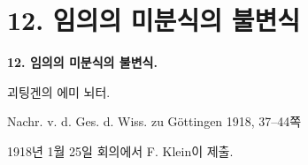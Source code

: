 
\section*{12. 임의의 미분식의 불변식}
\begin{center}
{\Large\bfseries 12. 임의의 미분식의 불변식.}\par
\vspace{0.8em}
괴팅겐의 에미 뇌터.\par
\vspace{1.5em}
Nachr. v. d. Ges. d. Wiss. zu Göttingen 1918, 37--44쪽
\end{center}

\vspace{3em}
\begin{center}
1918년 1월 25일 회의에서 F. Klein이 제출.
\end{center}

